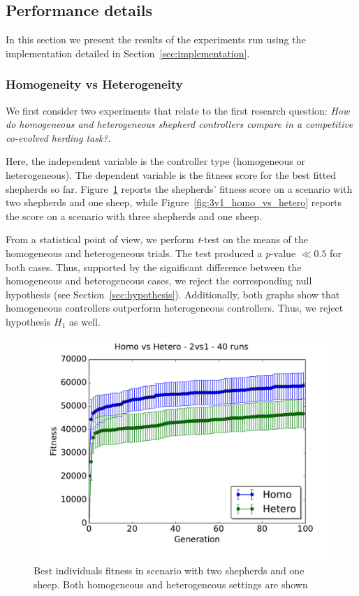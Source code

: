 \documentclass[conference]{IEEEtran}
\begin{document}
\subsection{Performance details}
\label{sec:experiments_performances}
In this section we present the results of the experiments run using the implementation detailed in Section~\ref{sec:implementation}.
\vspace{0.5em}
\subsubsection{Homogeneity vs Heterogeneity}
We first consider two experiments that relate to the first research question: \textit{How do homogeneous and heterogeneous shepherd controllers compare in a competitive co-evolved herding task?}. 

Here, the independent variable is the controller type (homogeneous or heterogeneous). The dependent variable is the fitness score for the best fitted shepherds so far. 
Figure~\ref{fig:2v1_homo_vs_hetero} reports the shepherds' fitness score on a scenario with two shepherds and one sheep, while Figure~\ref{fig:3v1_homo_vs_hetero} reports the score on a scenario with three shepherds and one sheep.

From a statistical point of view, we perform \textit{t}-test on the means of the homogeneous and heterogeneous trials. The test  produced a \textit{p}-value $\ll0.5$ for both cases.
Thus, supported by the significant difference between the homogeneous and heterogeneous cases, we reject the corresponding null hypothesis (see Section~\ref{sec:hypothesis}).
Additionally, both graphs show that homogeneous controllers outperform heterogeneous controllers. Thus, we reject hypothesis $H_1$ as well. 

\begin{figure}[ht]
	\centering
	\includegraphics[width=1\hsize]{imgs/homo2v1-hetero2v1-bestSoFar.pdf}
	\caption{Best individuals fitness in scenario with two shepherds and one sheep. Both homogeneous and heterogeneous settings are shown}
	\label{fig:2v1_homo_vs_hetero}
\end{figure}
\end{document}
